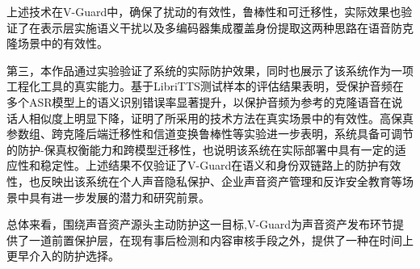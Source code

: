 上述技术在V-Guard中，确保了扰动的有效性，鲁棒性和可迁移性，实际效果也验证了在表示层实施语义干扰以及多编码器集成覆盖身份提取这两种思路在语音防克隆场景中的有效性。

第三，本作品通过实验验证了系统的实际防护效果，同时也展示了该系统作为一项工程化工具的真实能力。基于LibriTTS测试样本的评估结果表明，受保护音频在多个ASR模型上的语义识别错误率显著提升，以保护音频为参考的克隆语音在说话人相似度上明显下降，证明了所采用的技术方法在真实场景中的有效性。高保真参数组、跨克隆后端迁移性和信道变换鲁棒性等实验进一步表明，系统具备可调节的防护-保真权衡能力和跨模型迁移性，也说明该系统在实际部署中具有一定的适应性和稳定性。上述结果不仅验证了V-Guard在语义和身份双链路上的防护有效性，也反映出该系统在个人声音隐私保护、企业声音资产管理和反诈安全教育等场景中具有进一步发展的潜力和研究前景。

总体来看，围绕声音资产源头主动防护这一目标,V-Guard为声音资产发布环节提供了一道前置保护层，在现有事后检测和内容审核手段之外，提供了一种在时间上更早介入的防护选择。\protect{}\label{_Toc617022676}{}

\FloatBarrier
